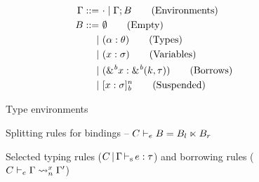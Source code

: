 \begin{figure}[tp]
  \begin{minipage}{0.36\linewidth}
  \begin{align*}
    \Gamma ::=&\ \cdot \mid \Gamma;B\tag{Environments}\\
    B ::=&\ \emptyset \tag{Empty} \\
    |&\ (\alpha : \theta) \tag{Types}\\
    |&\ (x : \sigma) \tag{Variables} \\
    |&\ ({\&}^{\textit{b}}x : {\&}^{\textit{b}}(k,\tau)) \tag{Borrows}\\
    |&\ [x : \sigma]_{\textit{b}}^n \tag{Suspended}
  \end{align*}
  \vspace{-10pt}
  \caption{Type environments}
  \label{grammar:env}
  \end{minipage}\hfill
  \begin{minipage}{0.6\linewidth}
    
    \vspace{-5pt}
    \caption{Splitting rules for bindings -- $C \vdash_e B = B_l \ltimes B_r$}
    \label{sdtyp:split}
  \end{minipage}
\end{figure}


\begin{figure*}[tp]
    \vspace{-10pt}
    \caption{Selected typing rules ($C \operatorname{|} \Gamma \operatorname{\vdash_s} e : \tau$)
      and borrowing rules ($C \vdash_e \Gamma \rightsquigarrow_{n}^{x} \Gamma'$)}
    \label{selectrules:borrow}
    \label{selectrules:binders}
    \label{sdtyp:app}
    \label{selectrules:region}
    \label{env:rule:borrow}
    \vspace{-5pt}
\end{figure*}

